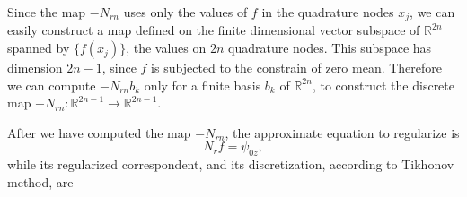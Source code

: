 \documentclass[10pt, a4paper, twoside, openright]{book}
\theoremstyle{definition}
\theoremstyle{plain}
\theoremstyle{plain}
\theoremstyle{plain}
\theoremstyle{plain}
\theoremstyle{plain}
\theoremstyle{plain}
\theoremstyle{plain}
\theoremstyle{plain}
\let\phi\varphi
\begin{document}
Since the map $-N_{rn}$ uses only the values of $f$ in the quadrature nodes $x_j$, we can easily 
construct a map defined on the finite dimensional vector subspace of $\mathbb{R}^{2n}$ spanned by 
$\{f(x_j)\}$, the values on $2n$ quadrature nodes. This subspace has dimension $2n-1$, 
since $f$ is subjected to the constrain of zero mean. Therefore we can compute $-N_{rn}b_k$ 
only for a finite basis $b_k$ of $\mathbb{R}^{2n}$, to construct the discrete map 
$-N_{rn}:\mathbb{R}^{2n-1}\to \mathbb{R}^{2n-1}$.
% 
\par
After we have computed the map $-N_{rn}$, 
the approximate equation to regularize is
\begin{equation}
 N_r f = \psi_{0z},
\end{equation}
while its regularized correspondent, and its discretization, according to Tikhonov method, are
\end{document}
